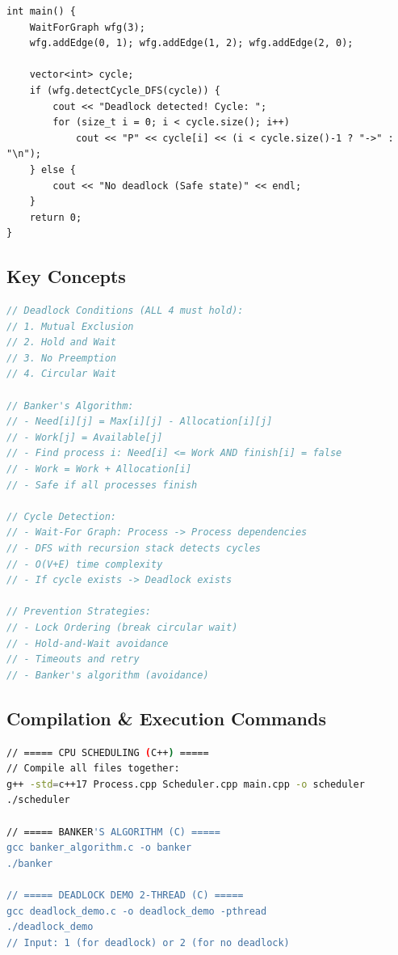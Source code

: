 \documentclass[a4paper,10pt,oneside]{article}
\begin{document}
\begin{multicols*}{\COLS}
\begin{lstlisting}
int main() {
    WaitForGraph wfg(3);
    wfg.addEdge(0, 1); wfg.addEdge(1, 2); wfg.addEdge(2, 0);
    
    vector<int> cycle;
    if (wfg.detectCycle_DFS(cycle)) {
        cout << "Deadlock detected! Cycle: ";
        for (size_t i = 0; i < cycle.size(); i++)
            cout << "P" << cycle[i] << (i < cycle.size()-1 ? "->" : "\n");
    } else {
        cout << "No deadlock (Safe state)" << endl;
    }
    return 0;
}
\end{lstlisting}

\subsection*{Key Concepts}
\begin{lstlisting}[language=C, commentstyle=\color{black}, keywordstyle=\color{black}, stringstyle=\color{black}]
// Deadlock Conditions (ALL 4 must hold):
// 1. Mutual Exclusion
// 2. Hold and Wait
// 3. No Preemption
// 4. Circular Wait

// Banker's Algorithm:
// - Need[i][j] = Max[i][j] - Allocation[i][j]
// - Work[j] = Available[j]
// - Find process i: Need[i] <= Work AND finish[i] = false
// - Work = Work + Allocation[i]
// - Safe if all processes finish

// Cycle Detection:
// - Wait-For Graph: Process -> Process dependencies
// - DFS with recursion stack detects cycles
// - O(V+E) time complexity
// - If cycle exists -> Deadlock exists

// Prevention Strategies:
// - Lock Ordering (break circular wait)
// - Hold-and-Wait avoidance
// - Timeouts and retry
// - Banker's algorithm (avoidance)
\end{lstlisting}

\subsection*{Compilation \& Execution Commands}
\begin{lstlisting}[language=bash, commentstyle=\color{black}, keywordstyle=\color{black}, stringstyle=\color{black}]
// ===== CPU SCHEDULING (C++) =====
// Compile all files together:
g++ -std=c++17 Process.cpp Scheduler.cpp main.cpp -o scheduler
./scheduler

// ===== BANKER'S ALGORITHM (C) =====
gcc banker_algorithm.c -o banker
./banker

// ===== DEADLOCK DEMO 2-THREAD (C) =====
gcc deadlock_demo.c -o deadlock_demo -pthread
./deadlock_demo
// Input: 1 (for deadlock) or 2 (for no deadlock)


\end{lstlisting}
\end{multicols*}
\end{document}
